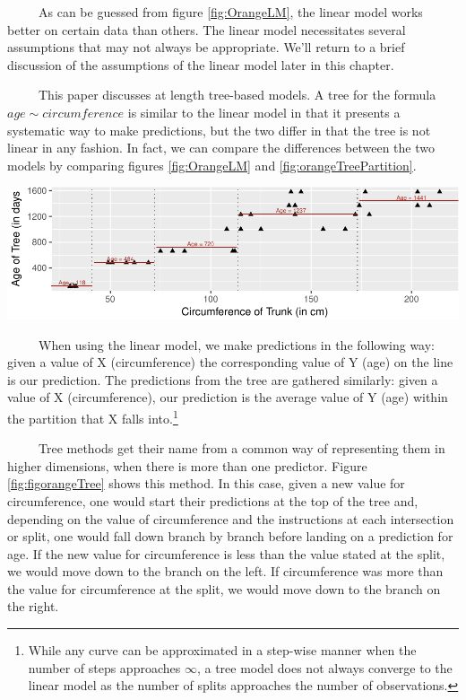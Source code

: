 \documentclass[12pt,twoside]{reedthesis}
\let\origfigure\figure
\let\endorigfigure\endfigure
\renewenvironment{figure}[1][2] {
    \expandafter\origfigure\expandafter[H]
} {
    \endorigfigure
}
\begin{document}
  ~~~~~As can be guessed from figure \ref{fig:OrangeLM}, the linear model
  works better on certain data than others. The linear model necessitates
  several assumptions that may not always be appropriate. We'll return to
  a brief discussion of the assumptions of the linear model later in this
  chapter.
  
  ~~~~~This paper discusses at length tree-based models. A tree for the
  formula \(age \sim circumference\) is similar to the linear model in
  that it presents a systematic way to make predictions, but the two
  differ in that the tree is not linear in any fashion. In fact, we can
  compare the differences between the two models by comparing figures
  \ref{fig:OrangeLM} and \ref{fig:orangeTreePartition}.
  
  \begin{figure}[H]
  
  {\centering \includegraphics{Thesis_files/figure-latex/unnamed-chunk-6-1} 
  
  }
  
  \caption{\label{fig:orangeTreePartition}A tree modeling the formula age \(\sim\)  trunk circumference first creates partitions on the predictor, seen as vertical lines, and then predicts the value of the response within that partition, seen as text.}\label{fig:unnamed-chunk-6}
  \end{figure}
  
  ~~~~~When using the linear model, we make predictions in the following
  way: given a value of X (circumference) the corresponding value of Y
  (age) on the line is our prediction. The predictions from the tree are
  gathered similarly: given a value of X (circumference), our prediction
  is the average value of Y (age) within the partition that X falls
  into.\footnote{While any curve can be approximated in a step-wise manner
    when the number of steps approaches \(\infty\), a tree model does not
    always converge to the linear model as the number of splits approaches
    the number of observations.}
  
  ~~~~~Tree methods get their name from a common way of representing them
  in higher dimensions, when there is more than one predictor. Figure
  \ref{fig:figorangeTree} shows this method. In this case, given a new
  value for circumference, one would start their predictions at the top of
  the tree and, depending on the value of circumference and the
  instructions at each intersection or split, one would fall down branch
  by branch before landing on a prediction for age. If the new value for
  circumference is less than the value stated at the split, we would move
  down to the branch on the left. If circumference was more than the value
  for circumference at the split, we would move down to the branch on the
  right.
  
\end{document}
